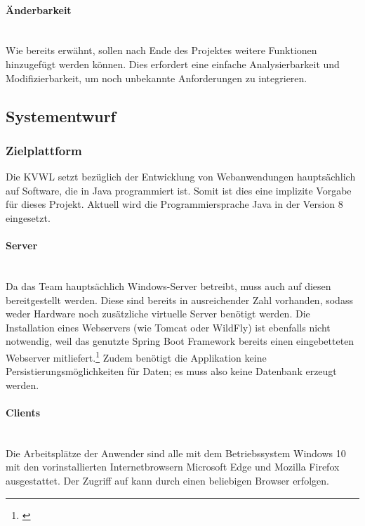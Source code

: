 \paragraph{Änderbarkeit}~\\\label{p:Aenderbarkeit}
Wie bereits erwähnt, sollen nach Ende des Projektes weitere Funktionen hinzugefügt werden können. Dies erfordert eine einfache Analysierbarkeit und Modifizierbarkeit, um noch unbekannte Anforderungen zu integrieren.

\subsection{Systementwurf}\label{sec:Systementwurf}

\subsubsection{Zielplattform}\label{sec:Zielplattform}
Die \ac{KVWL} setzt bezüglich der Entwicklung von Webanwendungen hauptsächlich auf Software, die in Java programmiert ist. Somit ist dies eine implizite Vorgabe für dieses Projekt. Aktuell wird die Programmiersprache Java in der Version 8 eingesetzt.

\paragraph{Server}~\\\label{p:Server}
 Da das Team \teamName hauptsächlich Windows-Server betreibt, muss auch \projektName auf diesen bereitgestellt werden. Diese sind bereits in ausreichender Zahl vorhanden, sodass weder Hardware noch zusätzliche virtuelle Server benötigt werden. Die Installation eines Webservers (wie Tomcat oder WildFly) ist ebenfalls nicht notwendig, weil das genutzte Spring Boot Framework bereits einen eingebetteten Webserver mitliefert.\footnote{\Vgl \cite{spring:web}} Zudem benötigt die Applikation keine Persistierungsmöglichkeiten für Daten; es muss also keine Datenbank erzeugt werden.
 
\paragraph{Clients} ~\\\label{p:Clients}
 Die Arbeitsplätze der Anwender sind alle mit dem Betriebssystem Windows 10 mit den vorinstallierten Internetbrowsern Microsoft Edge und Mozilla Firefox ausgestattet. Der Zugriff auf \projektName kann durch einen beliebigen Browser erfolgen.

